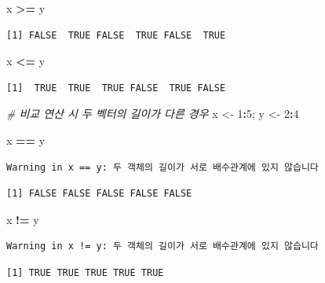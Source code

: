 \documentclass[
  11pt,
]{krantz}
\newenvironment{Shaded}{\begin{snugshade}}{\end{snugshade}}
\newcommand{\CommentTok}[1]{\textcolor[rgb]{0.37,0.37,0.37}{\textit{#1}}}
\newcommand{\DecValTok}[1]{\textcolor[rgb]{0.06,0.06,0.06}{#1}}
\newcommand{\NormalTok}[1]{#1}
\newcommand{\OperatorTok}[1]{\textcolor[rgb]{0.43,0.43,0.43}{\textbf{#1}}}
\newcommand{\StringTok}[1]{\textcolor[rgb]{0.5,0.5,0.5}{#1}}
\begin{document}
\begin{Shaded}
\begin{Highlighting}[]
\NormalTok{x }\OperatorTok{>=}\StringTok{ }\NormalTok{y}
\end{Highlighting}
\end{Shaded}

\begin{verbatim}
[1] FALSE  TRUE FALSE  TRUE FALSE  TRUE
\end{verbatim}

\begin{Shaded}
\begin{Highlighting}[]
\NormalTok{x }\OperatorTok{<=}\StringTok{ }\NormalTok{y}
\end{Highlighting}
\end{Shaded}

\begin{verbatim}
[1]  TRUE  TRUE  TRUE FALSE  TRUE FALSE
\end{verbatim}

\begin{Shaded}
\begin{Highlighting}[]
\CommentTok{# 비교 연산 시 두 벡터의 길이가 다른 경우}
\NormalTok{x <-}\StringTok{ }\DecValTok{1}\OperatorTok{:}\DecValTok{5}\NormalTok{; y <-}\StringTok{ }\DecValTok{2}\OperatorTok{:}\DecValTok{4}

\NormalTok{x }\OperatorTok{==}\StringTok{ }\NormalTok{y}
\end{Highlighting}
\end{Shaded}

\begin{verbatim}
Warning in x == y: 두 객체의 길이가 서로 배수관계에 있지 않습니다
\end{verbatim}

\begin{verbatim}
[1] FALSE FALSE FALSE FALSE FALSE
\end{verbatim}

\begin{Shaded}
\begin{Highlighting}[]
\NormalTok{x }\OperatorTok{!=}\StringTok{ }\NormalTok{y}
\end{Highlighting}
\end{Shaded}

\begin{verbatim}
Warning in x != y: 두 객체의 길이가 서로 배수관계에 있지 않습니다
\end{verbatim}

\begin{verbatim}
[1] TRUE TRUE TRUE TRUE TRUE
\end{verbatim}
\end{document}
